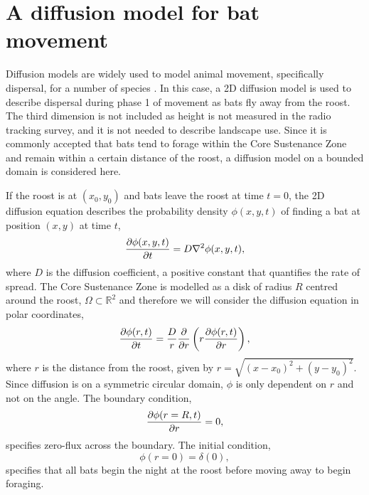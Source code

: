 \section{A diffusion model for bat movement} \label{diffusion}

Diffusion models are widely used to model animal movement, specifically dispersal, for a number of
species \cite{Ovaskainen2016}. In this case, a 2D diffusion model is used to
describe dispersal during phase 1 of movement as bats fly away from the roost. The third dimension is not
included as height is not measured in the radio tracking survey, and it is not
needed to describe landscape use. Since it is commonly accepted that bats tend
to forage within the Core Sustenance Zone and remain within a certain distance
 of the roost, a diffusion model on a bounded domain is considered here.

If the roost is at $(x_0,y_0)$ and bats leave the roost at time $t =0$,
the 2D diffusion equation describes the probability density $\phi(x,y,t)$ of
finding a bat at position $(x,y)$ at time $t$,
%
\begin{equation}
  \frac{\partial \phi(x,y,t)}{\partial t} = D \nabla^2 \phi(x,y,t) ,
  \label{eqn:diffusion_cartesian}
\end{equation}
%
where $D$ is the diffusion coefficient, a positive constant that quantifies the
 rate of spread. The Core Sustenance Zone is modelled as a disk of radius $R$ centred around the roost, $\Omega \subset \mathbb{R}^2$ and therefore we will consider the diffusion equation in polar coordinates,
 \begin{equation}
 \frac{\partial  \phi(r,t)}{\partial t} = \frac{D}{r} \frac{\partial }{\partial  r} \left( r \frac{\partial \phi(r,t)}{\partial r} \right),
 \label{eqn:diffusion_polar}
 \end{equation}
 where $r$ is the distance from the roost, given by $r=\sqrt{(x-x_0)^2 +
 (y-y_0)^2}$. Since diffusion is on a symmetric circular domain, $\phi$ is only dependent on $r$ and not
  on the angle. The boundary condition,
%
\begin{equation}
  \frac{\partial \phi(r=R,t)}{\partial r} = 0,
\end{equation}
%
specifies zero-flux across the boundary. The initial condition,
%
 \begin{equation}
 \phi(r = 0) = \delta(0),
 \label{eqn:IC}
 \end{equation}
%
specifies that all bats begin the night at the roost before moving away to begin foraging.

